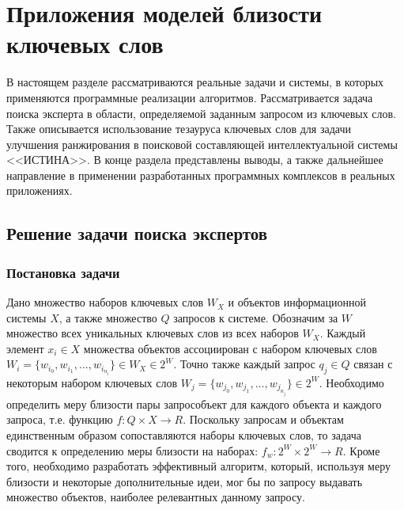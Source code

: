 \chapter{Приложения моделей близости ключевых слов} \label{chapt1}
В настоящем разделе рассматриваются реальные задачи и системы, в которых применяются программные реализации алгоритмов. 
Рассматривается задача поиска эксперта в области, определяемой заданным запросом из ключевых слов.
Также описывается использование тезауруса ключевых слов для задачи улучшения ранжирования в поисковой составляющей интеллектуальной системы <<ИСТИНА>>.
В конце раздела представлены выводы, а также дальнейшее направление в применении разработанных программных комплексов в реальных приложениях.

\section{Решение задачи поиска экспертов} \label{expert_search}
\subsection{Постановка задачи}
Дано множество наборов ключевых слов $W_X$ и объектов информационной системы $X$, а также множество $Q$ запросов к системе. Обозначим за $W$ множество всех уникальных ключевых слов из всех наборов $W_X$. Каждый элемент $x_i \in X$ множества объектов ассоциирован с набором ключевых слов $W_i = \{w_{i_0}, w_{i_1}, ..., w_{i_{n_i}} \} \in W_X \in 2^W$. Точно также каждый запрос $q_j \in Q$ связан с некоторым набором ключевых слов $W_j = \{w_{j_0}, w_{j_1}, ..., w_{j_{n_j}} \} \in 2^W$. Необходимо определить меру близости пары запрос­объект для каждого объекта и каждого запроса, т.е.  функцию $f : Q \times X \rightarrow R$. Поскольку запросам и объектам единственным образом сопоставляются наборы ключевых слов, то задача сводится к определению меры близости на наборах: $f_w : 2^W \times 2^W \rightarrow R$. Кроме того, необходимо разработать эффективный алгоритм, который, используя меру близости и некоторые дополнительные идеи, мог бы по запросу выдавать множество объектов, наиболее релевантных данному запросу.
